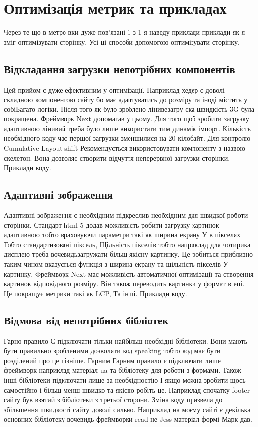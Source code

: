 \newpage
\section{Оптимізація метрик та прикладах}
Через те що в метро вки дуже пов'язані 1 з 1 я наведу приклади приклади як я зміг оптимізувати сторінку.
Усі ці способи допомогою оптимізувати сторінку.
\subsection{Відкладання загрузки непотрібних компонентів}
Цей прийом є дуже ефективним у оптимізації. Наприклад хедер є доволі складною компонентою сайту бо має адаптуватись до розміру та іноді містить у собіБагато логіки.
Після того як було зроблено лінивезагру ска швидкість 3G була покращена.
Фреймворк Next допомагав у цьому. Для того щоб зробити загрузку адаптивною лінивий треба було лише використати тим динамік імпорт.
Кількість необхідного коду час першої загрузки зменшилися на 20 кілобайт.
Для контролю Cumulative Layout shift Рекомендується використовувати компоненту з назвою скелетон.
Вона дозволяє створити відчуття неперервної загрузки сторінки.
Приклади коду.

\subsection{Адаптивні зображення}
Адаптивні зображення є необхідним підкреслив необхідним для швидкої роботи сторінки.
Стандарт html 5 додав можливість робити загрузку картинок адаптивною тобто враховуючи параметри такі як ширина екрану У в пікселях Тобто стандартизовані піксель, Щільність пікселів тобто наприклад для чотирика дисплею треба вочевидьзагружати більш якісну картинку.
Це робиться приблизно таким чином вказується функція з ширина екрану та щільність пікселів У картинку. Фреймворк Next має можливість автоматичної оптимізації та створення картинок відповідного розміру. Він також переводить картинки у формат в епі.
Це покращує метрики такі як LCP, Та інші.
Приклади коду.

\subsection{Відмова від непотрібних бібліотек}
Гарно правило Є підключати тільки найбільш необхідні бібліотеки. Вони мають бути правильно зробленими дозволяти код speaking тобто код має бути розділений про це пізніше. Гарним Гарним правило є підключати лише фреймворк наприклад матеріал ua та бібліотеку для роботи з формами. Також інші бібліотеки підключати лише за необхідностію І якщо можна зробити щось самостійно і більш-менш швидко та якісно робіть це.
Наприклад спочатку footer сайту був взятий з бібліотеки з третьої сторони.
Зміна коду призвела до збільшення швидкості сайту доволі сильно.
Наприклад на моєму сайті є декілька основних бібліотеку вочевидь фреймворки read не Jess матеріал формі Марк дав.

